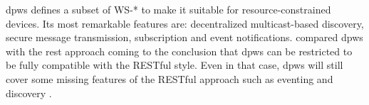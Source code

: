 \ac{dpws} defines a subset of WS-* to make it suitable for resource-constrained devices.
Its most remarkable features are: decentralized multicast-based discovery, secure message transmission, subscription and event notifications.
\citet{moritz_devices_2010} compared \ac{dpws} with the \ac{rest} approach coming to the conclusion that \ac{dpws} can be restricted to be fully compatible with the RESTful style.
Even in that case, \ac{dpws} will still cover some missing features of the RESTful approach such as eventing and discovery \citep{moritz_devices_2010}.
